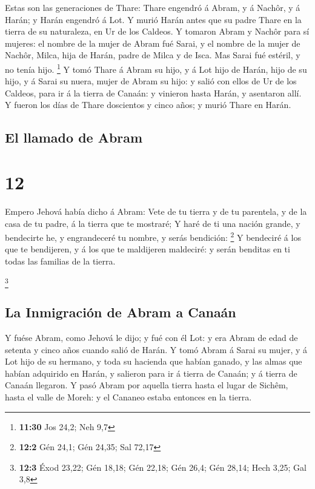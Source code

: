  Estas son las generaciones de Thare: Thare engendró á
Abram, y á Nachôr, y á Harán; y Harán engendró á Lot.  Y
murió Harán antes que su padre Thare en la tierra de su naturaleza, en
Ur de los Caldeos.  Y tomaron Abram y Nachôr para sí
mujeres: el nombre de la mujer de Abram fué Sarai, y el nombre de la
mujer de Nachôr, Milca, hija de Harán, padre de Milca y de Isca.
 Mas Sarai fué estéril, y no tenía hijo. \footnote{\textbf{11:30}
  Jos 24,2; Neh 9,7}  Y tomó Thare á Abram su hijo, y á Lot
hijo de Harán, hijo de su hijo, y á Sarai su nuera, mujer de Abram su
hijo: y salió con ellos de Ur de los Caldeos, para ir á la tierra de
Canaán: y vinieron hasta Harán, y asentaron allí.  Y fueron
los días de Thare doscientos y cinco años; y murió Thare en Harán.

\hypertarget{el-llamado-de-abram}{%
\subsection{El llamado de Abram}\label{el-llamado-de-abram}}

\hypertarget{section-11}{%
\section{12}\label{section-11}}

 Empero Jehová había dicho á Abram: Vete de tu tierra y de
tu parentela, y de la casa de tu padre, á la tierra que te mostraré;
 Y haré de ti una nación grande, y bendecirte he, y
engrandeceré tu nombre, y serás bendición: \footnote{\textbf{12:2} Gén
  24,1; Gén 24,35; Sal 72,17}  Y bendeciré á los que te
bendijeren, y á los que te maldijeren maldeciré: y serán benditas en ti
todas las familias de la tierra.

\footnote{\textbf{12:3} Éxod 23,22; Gén 18,18; Gén 22,18; Gén 26,4; Gén
  28,14; Hech 3,25; Gal 3,8}

\hypertarget{la-inmigraciuxf3n-de-abram-a-canauxe1n}{%
\subsection{La Inmigración de Abram a
Canaán}\label{la-inmigraciuxf3n-de-abram-a-canauxe1n}}

 Y fuése Abram, como Jehová le dijo; y fué con él Lot: y era
Abram de edad de setenta y cinco años cuando salió de Harán.
 Y tomó Abram á Sarai su mujer, y á Lot hijo de su hermano,
y toda su hacienda que habían ganado, y las almas que habían adquirido
en Harán, y salieron para ir á tierra de Canaán; y á tierra de Canaán
llegaron.  Y pasó Abram por aquella tierra hasta el lugar de
Sichêm, hasta el valle de Moreh: y el Cananeo estaba entonces en la
tierra.

